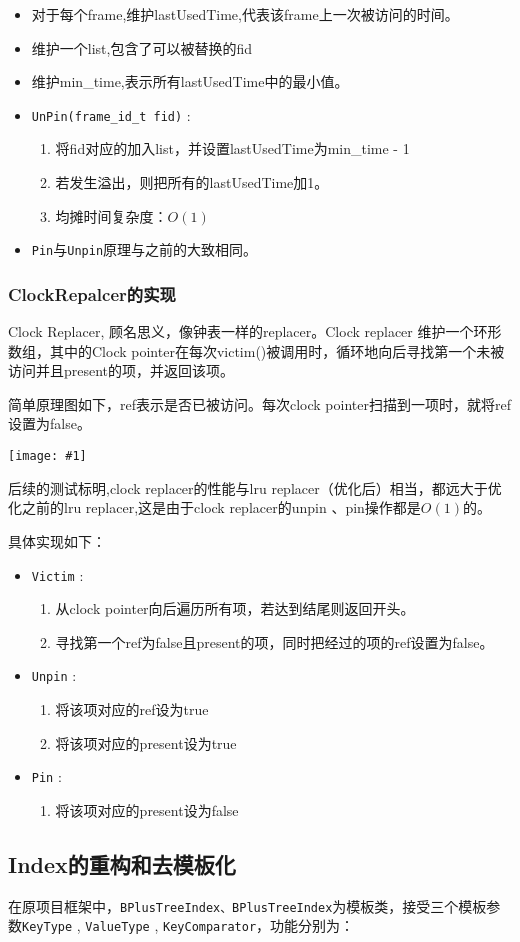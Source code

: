 \documentclass[12pt, a4paper]{article}
\def\c#1{\texttt{#1}}
\def\ss#1{\subsection{#1}}
\def\sss#1{\subsubsection{#1}}
\def\fid{frame\_id\_t\ }
\def\p{\par}
\def\g#1{\begin{center}\texttt{[image: \#1]}\end{center}}
\begin{document}
\begin{itemize}
  \item 对于每个frame,维护lastUsedTime,代表该frame上一次被访问的时间。
  \item 维护一个list,包含了可以被替换的fid 
  \item 维护min\_time,表示所有lastUsedTime中的最小值。
  \item \c{UnPin(\fid fid)} :\begin{enumerate}
    \item 将fid对应的加入list，并设置lastUsedTime为min\_time - 1
    \item 若发生溢出，则把所有的lastUsedTime加1。
    \item 均摊时间复杂度：$O(1)$
  \end{enumerate} 
  \item \c{Pin}与\c{Unpin}原理与之前的大致相同。
\end{itemize}
\sss{ClockRepalcer的实现}
\p Clock Replacer, 顾名思义，像钟表一样的replacer。Clock replacer 维护一个环形数组，其中的Clock pointer在每次victim()被调用时，循环地向后寻找第一个未被访问并且present的项，并返回该项。
\p 简单原理图如下，ref表示是否已被访问。每次clock pointer扫描到一项时，就将ref设置为false。
\g{clock_replacer.pdf}
\p 后续的测试标明,clock replacer的性能与lru replacer（优化后）相当，都远大于优化之前的lru replacer,这是由于clock replacer的unpin 、pin操作都是$O(1)$的。
\p 具体实现如下：
\begin{itemize}
  \item \c{Victim} : \begin{enumerate}
    \item 从clock pointer向后遍历所有项，若达到结尾则返回开头。
    \item 寻找第一个ref为false且present的项，同时把经过的项的ref设置为false。
  \end{enumerate}
  \item \c{Unpin} : \begin{enumerate}
    \item 将该项对应的ref设为true
    \item 将该项对应的present设为true
  \end{enumerate}
  \item \c{Pin} :\begin{enumerate}
    \item 将该项对应的present设为false
  \end{enumerate}
\end{itemize}
\ss{Index的重构和去模板化}
\p 在原项目框架中，\c{BPlusTreeIndex、BPlusTreeIndex}为模板类，接受三个模板参数\c{KeyType} , \c{ValueType} , \c{KeyComparator}，功能分别为：
\end{document}
